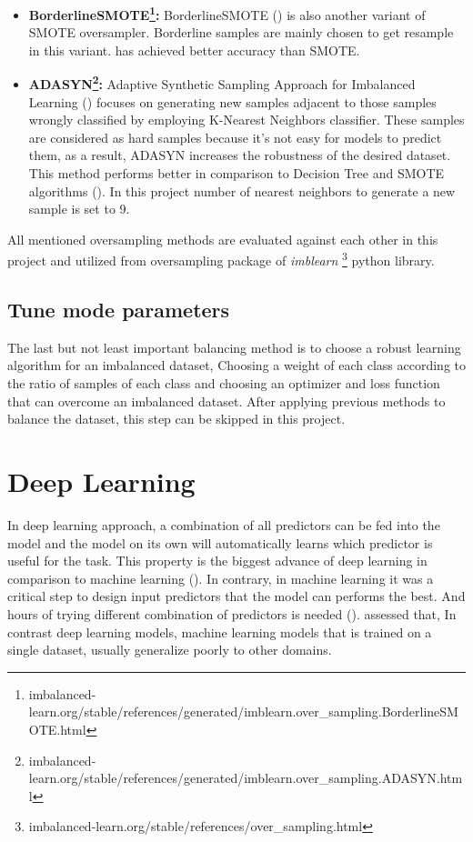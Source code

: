 \begin{itemize}
	\item \textbf{BorderlineSMOTE\footnote{imbalanced-learn.org/stable/references/generated/imblearn.over\_sampling.BorderlineSMOTE.html}:} 
	BorderlineSMOTE (\cite{borderlinesmothe}) is also another variant of SMOTE oversampler. Borderline samples are mainly chosen to get resample in this variant. \cite{borderlinesmothe} has achieved better accuracy than SMOTE.
	\item \textbf{ADASYN\footnote{imbalanced-learn.org/stable/references/generated/imblearn.over\_sampling.ADASYN.html}:} 
	Adaptive Synthetic Sampling Approach for Imbalanced Learning (\cite{adasyn}) focuses on generating new samples adjacent to those samples wrongly classified by employing K-Nearest Neighbors classifier. These samples are considered as hard samples because it's not easy for models to predict them, as a result, ADASYN increases the robustness of the desired dataset. This method performs better in comparison to Decision Tree and SMOTE algorithms (\cite{adasyn}). In this project number of nearest neighbors to generate a new sample is set to 9.
	
\end{itemize}
All mentioned oversampling methods are evaluated against each other in this project and utilized from oversampling package of \textit{imblearn} \footnote{imbalanced-learn.org/stable/references/over\_sampling.html} python library. 

\subsection{Tune mode parameters}
 The last but not least important balancing method is to choose a robust learning algorithm for an imbalanced dataset, Choosing a weight of each class according to the ratio of samples of each class and choosing an optimizer and loss function that can overcome an imbalanced dataset. After applying previous methods to balance the dataset, this step can be skipped in this project. 




\section{Deep Learning}
In deep learning approach, a combination of all predictors can be fed into the model and the model on its own will automatically learns which predictor is useful for the task. This property is the biggest advance of deep learning in comparison to machine learning (\cite{book_datafake}). In contrary, in machine learning it was a critical step to design input predictors that the model can performs the best. And hours of trying different combination of predictors is needed (\cite{book_fake}). \cite{stance_robust} assessed that, In contrast deep learning models, machine learning models that is trained on a single dataset, usually generalize poorly to other domains.

